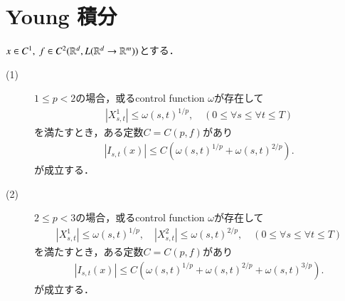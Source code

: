 \section{Young 積分}
	\begin{screen}
		\begin{lem}\label{lem:lemma_for_Young_integral}
			$x \in C^1,\ f \in C^2(\mathbb{R}^d,L(\mathbb{R}^d \rightarrow \mathbb{R}^m))$とする．
			\begin{description}
				\item[(1)]
					$1 \leq p < 2$の場合，或るcontrol function $\omega$が存在して
					\begin{align}
						\left| X^1_{s,t} \right|
						\leq \omega(s,t)^{1/p},
						\quad (0 \leq \forall s \leq \forall t \leq T)
					\end{align}
					を満たすとき，ある定数$C=C(p,f)$があり
					\begin{align}
						\left|I_{s,t}(x) \right|
						\leq C\left( \omega(s,t)^{1/p} + \omega(s,t)^{2/p} \right).
					\end{align}
					が成立する．
				\item[(2)] $2 \leq p < 3$の場合，或るcontrol function $\omega$が存在して
					\begin{align}
						\left| X^1_{s,t} \right| \leq \omega(s,t)^{1/p},
						\quad \left| X^2_{s,t} \right| \leq \omega(s,t)^{2/p},
						\quad (0 \leq \forall s \leq \forall t \leq T)
					\end{align}
					を満たすとき，ある定数$C=C(p,f)$があり
					\begin{align}
						\left|I_{s,t}(x) \right|
						\leq C\left( \omega(s,t)^{1/p} + \omega(s,t)^{2/p} + \omega(s,t)^{3/p} \right).
					\end{align}
					が成立する．
			\end{description}
		\end{lem}
	\end{screen}
	
